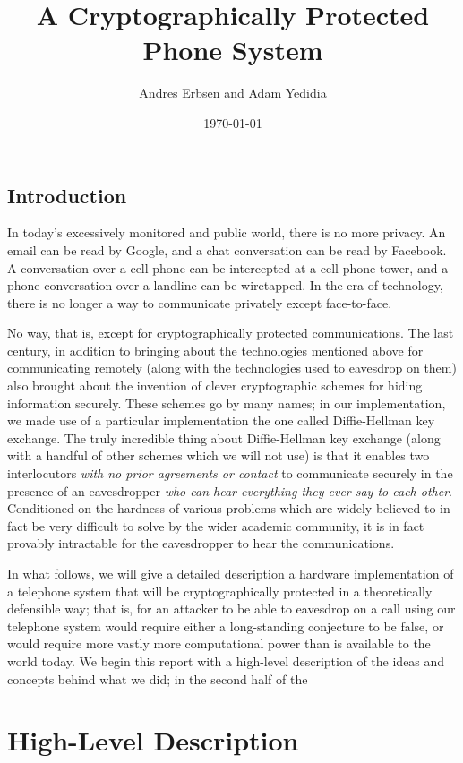 \documentclass[a4paper]{report}
\title{A Cryptographically Protected Phone System}
\author{Andres Erbsen and Adam Yedidia}
\date{\today}
\begin{document}
\maketitle

\section{Introduction}

In today's excessively monitored and public world, there is no more privacy. An
email can be read by Google, and a chat conversation can be read by Facebook. A
conversation over a cell phone can be intercepted at a cell phone tower, and a
phone conversation over a landline can be wiretapped. In the era of technology,
there is no longer a way to communicate privately except face-to-face.

No way, that is, except for cryptographically protected communications. The last
century, in addition to bringing about the technologies mentioned above for
communicating remotely (along with the technologies used to eavesdrop on them)
also brought about the invention of clever cryptographic schemes for hiding
information securely. These schemes go by many names; in our implementation, we
made use of a particular implementation the one called Diffie-Hellman key
exchange. The truly incredible thing about Diffie-Hellman key exchange (along
with a handful of other schemes which we will not use) is that it enables two
interlocutors \emph{with no prior agreements or contact} to communicate securely
in the presence of an eavesdropper \emph{who can hear everything they ever say
to each other}. Conditioned on the hardness of various problems which are widely
believed to in fact be very difficult to solve by the wider academic community,
it is in fact provably intractable for the eavesdropper to hear the
communications.

In what follows, we will give a detailed description a hardware implementation of a telephone
system that will be cryptographically protected in a theoretically defensible
way; that is, for an attacker to be able to eavesdrop on a call using our
telephone system would require either a long-standing conjecture to be false, or
would require more vastly more computational power than is available to the
world today. We begin this report with a high-level description of the ideas and concepts behind what we did; in the second half of the 

\chapter{High-Level Description}
\end{document}
